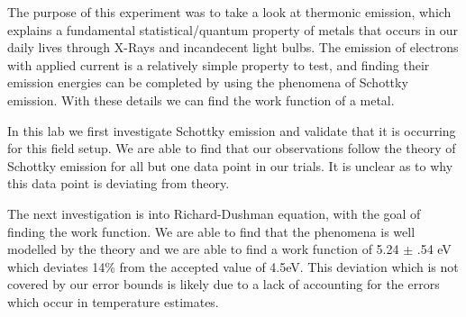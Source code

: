 The purpose of this experiment was to take a look at thermonic emission, which explains a fundamental statistical/quantum property of metals that occurs in our daily lives through X-Rays and incandecent light bulbs. The emission of electrons with applied current is a relatively simple property to test, and finding their emission energies can be completed by using the phenomena of Schottky emission. With these details we can find the work function of a metal.

\par

In this lab we first investigate Schottky emission and validate that it is occurring for this field setup. We are able to find that our observations follow the theory of Schottky emission for all but one data point in our trials. It is unclear as to why this data point is deviating from theory.

\par

The next investigation is into Richard-Dushman equation, with the goal of finding the work function. We are able to find that the phenomena is well modelled by the theory and we are able to find a work function of 5.24 $\pm$ .54 eV which deviates 14\% from the accepted value of 4.5eV. This deviation which is not covered by our error bounds is likely due to a lack of accounting for the errors which occur in temperature estimates.